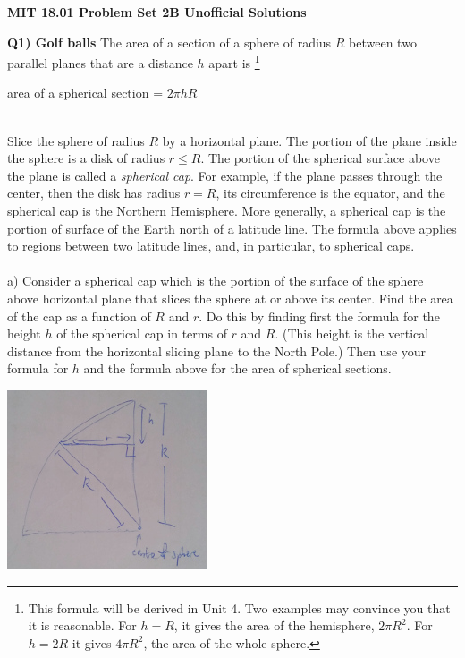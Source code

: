 \documentclass[9pt]{article}
\begin{document}
\begin{center}
  \large\textbf{MIT 18.01 Problem Set 2B Unofficial Solutions}
\end{center}

\begin{tcolorbox}
  \renewcommand{\thefootnote}{\roman{footnote}}
  \textbf{Q1) Golf balls} The area of a section of a sphere of radius $R$ between two parallel planes that are a distance $h$ apart is \footnote{This formula will be derived in Unit 4. Two examples may convince you that it is reasonable. For $h = R$, it gives the area of the hemisphere, $2 \pi R^2.$ For $h = 2R$ it gives $4 \pi R^2$, the area of the whole sphere.}\\
  \begin{center}
    area of a spherical section = $2 \pi h R$
  \end{center}
  \ \\
  Slice the sphere of radius $R$ by a horizontal plane. The portion of the plane inside the sphere is a disk of radius $r \leq R$. The portion of the spherical surface above the plane is called a \emph{spherical cap}. For example, if the plane passes through the center, then the disk has radius $r = R$, its circumference is the equator, and the spherical cap is the Northern Hemisphere. More generally, a spherical cap is the portion of surface of the Earth north of a latitude line. The formula above applies to regions between two latitude lines, and, in particular, to spherical caps.\\
  \\
  a) Consider a spherical cap which is the portion of the surface of the sphere above horizontal plane that slices the sphere at or above its center. Find the area of the cap as a function of $R$ and $r$. Do this by finding first the formula for the height $h$ of the spherical cap in terms of $r$ and $R$. (This height is the vertical distance from the horizontal slicing plane to the North Pole.) Then use your formula for $h$ and the formula above for the area of spherical sections.
\end{tcolorbox}

\begin{center}
  \includegraphics[scale=0.8]{q1a.jpg}
\end{center}
\end{document}
